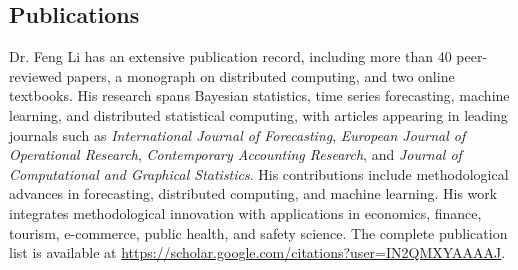 \documentclass[twoside,a4paper]{article}
\begin{document}
\begin{refsection}
\section{Publications}

Dr. Feng Li has an extensive publication record, including more than 40 peer-reviewed papers, a monograph on distributed computing, and two online textbooks. His research spans Bayesian statistics, time series forecasting, machine learning, and distributed statistical computing, with articles appearing in leading journals such as \emph{International Journal of Forecasting}, \emph{European Journal of Operational Research}, \emph{Contemporary Accounting Research}, and \emph{Journal of Computational and Graphical Statistics}. His contributions include methodological advances in forecasting, distributed computing, and machine learning. His work integrates methodological innovation with applications in economics, finance, tourism, e-commerce, public health, and safety science. The complete publication list is available at \url{https://scholar.google.com/citations?user=IN2QMXYAAAAJ}.

\nocite{LiF2026RecoveryInformedForecasting}
\nocite{WangZ2026ImpactTransportation}
\nocite{PanZ2025MyopiaHigh}
\nocite{ZhongY2025OptimalStarting}
\nocite{WangWen2025VARX}
\nocite{GaoY2025GridPoint}
\nocite{WangH2024CatastropheDuration}
\nocite{HuangY2024LocalInformation}
\nocite{RenY2023InfiniteForecast}
\nocite{ZhangG2023ProbabilisticForecast}
\nocite{LiF2024ForecasterReview}
\nocite{LiL2023ForecastingLarge}
\nocite{ZhangB2023OptimalReconciliation}
\nocite{LiL2023FeaturebasedIntermittent}
\nocite{WangX2023ForecastCombinations}
\nocite{PanR2022NoteDistributed}
\nocite{LiL2023BayesianForecast}
\nocite{WangZ2022EscalatorAccident}
\nocite{WangX2023DistributedARIMA}
\nocite{AndererM2022HierarchicalForecasting}
\nocite{JanewayMG2021ClinicalDiagnostic}
\nocite{PetropoulosF2022ForecastingTheory}
\nocite{KangY2022ForecastForecasts}
\nocite{TalagalaTS2022FFORMPPFeaturebased}
\nocite{ZhuX2021LeastSquareApproximation}
\nocite{WangX2022UncertaintyEstimation}
\nocite{KangY2021DejaVu}
\nocite{HaoC2020BilinearReduced}
\nocite{LiX2020ForecastingTime}
\nocite{KangY2020GRATISGeneRAting}
\nocite{kang2020statcompcn}
\nocite{HyndmanRJ2021FPP3CN}
\nocite{KalesanB2020IntersectionsFirearm}
\nocite{BaileyHM2019ChangesPatterns}
\nocite{LiF2019CreditRisk}
\nocite{LiF2018ImprovingForecasting}
\nocite{PinoEC2018CohortProfile}
\nocite{li2016distributedcn}
\nocite{LiF2013BayesianModeling}
\nocite{LiF2013EfficientBayesian}
\nocite{LiF2011ModelingConditional}
\nocite{LiF2010FlexibleModeling}


\end{refsection}
\end{document}
